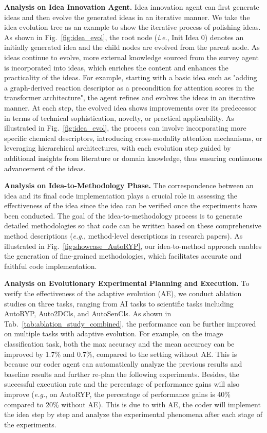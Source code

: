 \textbf{Analysis on Idea Innovation Agent.} Idea innovation agent can first generate ideas and then evolve the generated ideas in an iterative manner. We take the idea evolution tree as an example to show the iterative process of polishing ideas. As shown in Fig.~\ref{fig:idea_evol}, the root node (\textit{i.e.}, Init Idea 0) denotes an initially generated idea and the child nodes are evolved from the parent node. As ideas continue to evolve, more external knowledge sourced from the survey agent is incorporated into ideas, which enriches the content and enhances the practicality of the ideas. For example, starting with a basic idea such as "adding a graph-derived reaction descriptor as a precondition for attention scores in the transformer architecture", the agent refines and evolves the ideas in an iterative manner. At each step, the evolved idea shows improvements over its predecessor in terms of technical sophistication, novelty, or practical applicability. As illustrated in Fig.~\ref{fig:idea_evol}, the process can involve incorporating more specific chemical descriptors, introducing cross-modality attention mechanisms, or leveraging hierarchical architectures, with each evolution step guided by additional insights from literature or domain knowledge, thus ensuring continuous advancement of the ideas.

\textbf{Analysis on Idea-to-Methodology Phase.} The correspondence between an idea and its final code implementation plays a crucial role in assessing the effectiveness of the idea since the idea can be verified once the experiments have been conducted. The goal of the idea-to-methodology process is to generate detailed methodologies so that code can be written based on these comprehensive method descriptions (\textit{e.g.}, method-level descriptions in research papers). As illustrated in Fig.~\ref{fig:showcase_AutoRYP}, our idea-to-method approach enables the generation of fine-grained methodologies, which facilitates accurate and faithful code implementation.

\textbf{Analysis on Evolutionary Experimental Planning and Execution.} To verify the effectiveness of the adaptive evolution (AE), we conduct ablation studies on three tasks, ranging from AI tasks to scientific tasks including AutoRYP, Auto2DCls, and AutoSenCls. As shown in Tab.~\ref{tab:ablation_study_combined}, the performance can be further improved on multiple tasks with adaptive evolution. For example, on the image classification task, both the max accuracy and the mean accuracy can be improved by 1.7\% and 0.7\%, compared to the setting without AE. This is because our coder agent can automatically analyze the previous results and baseline results and further re-plan the following experiments. Besides, the successful execution rate and the percentage of performance gains will also improve (\textit{e.g.}, on AutoRYP, the percentage of performance gains is 40\% compared to 20\% without AE). This is due to with AE, the coder will implement the idea step by step and analyze the experimental phenomena after each stage of the experiments.

